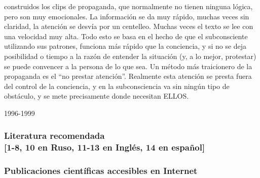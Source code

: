construidos los clips de propaganda, que normalmente no tienen ninguna
lógica, pero son muy emocionales. La información se da muy rápido,
muchas veces sin claridad, la atención se desvía por un centelleo.
Muchas veces el texto se lee con una velocidad muy alta. Todo esto se
basa en el hecho de que el subconsciente utilizando sus patrones,
funciona más rápido que la conciencia, y si no se deja posibilidad o
tiempo a la razón de entender la situación (y, a lo mejor, protestar) se
puede convencer a la persona de lo que sea. Un método más traicionero de
la propaganda es el ``no prestar atención''. Realmente esta atención se
presta fuera del control de la conciencia, y en la subconsciencia va sin
ningún tipo de obstáculo, y se mete precisamente donde necesitan ELLOS.

1996-1999

\vfill
\protect\hypertarget{M26}{}{}

\subsubsection{Literatura recomendada\\ {[}1-8, 10 en Ruso, 11-13 en
Inglés, 14 en
español{]}}\label{literatura-recomendada-1-8-10-en-ruso-11-13-en-ingluxe9s-14-en-espauxf1ol}

\subsubsection{Publicaciones científicas %
accesibles en Internet}\label{publicaciones-cientuxedficas-populares-accesibles-en-el-internet}

